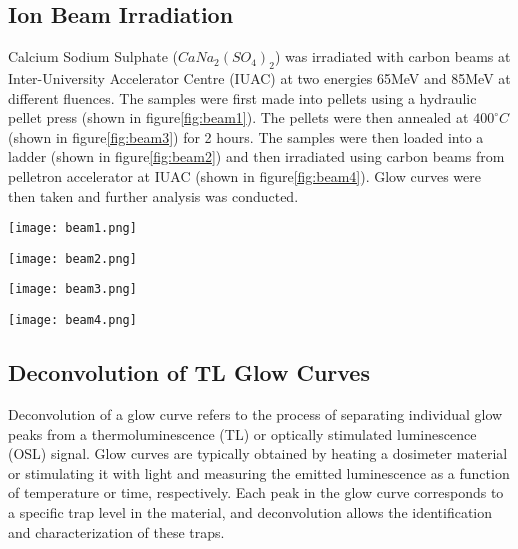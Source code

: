 \documentclass[../../Report.tex]{subfiles}
\begin{document}
    \subsection{\large Ion Beam Irradiation}
    Calcium Sodium Sulphate ($CaNa_2{(SO_4)}_2$) was irradiated with carbon beams at Inter-University Accelerator
    Centre (IUAC) at two energies 65MeV and 85MeV at different fluences. The samples were first made into pellets using
    a hydraulic pellet press (shown in figure\ref{fig:beam1}). The pellets were then annealed at $400^{\circ}C$ (shown in figure\ref{fig:beam3}) 
    for 2 hours. The samples were then loaded into a ladder (shown in figure\ref{fig:beam2}) and then irradiated using carbon beams from
    pelletron accelerator at IUAC (shown in figure\ref{fig:beam4}). Glow curves were then taken and further analysis was conducted.
    \FloatBarrier\begin{multicols}{2}
        \begin{Figure}
            \centering
            \texttt{[image: beam1.png]}
            \label{fig:beam1}
        \end{Figure}
        \begin{Figure}
            \centering
            \texttt{[image: beam2.png]}
            \label{fig:beam2}
        \end{Figure}
    \end{multicols} 
    \pagebreak
    \FloatBarrier\begin{multicols}{2}
        \begin{Figure}
            \centering
            \texttt{[image: beam3.png]}
            \label{fig:beam3}
        \end{Figure}
        \begin{Figure}
            \centering
            \texttt{[image: beam4.png]}
            \label{fig:beam4}
        \end{Figure}
    \end{multicols}

    \subsection{\large Deconvolution of TL Glow Curves}
        Deconvolution of a glow curve refers to the process of separating individual glow peaks from a 
        thermoluminescence (TL)\cite{a15} or optically stimulated luminescence (OSL) signal. Glow curves are typically 
        obtained by heating a dosimeter material or stimulating it with light and measuring the emitted 
        luminescence as a function of temperature or time, respectively. Each peak in the glow curve corresponds 
        to a specific trap level in the material, and deconvolution allows the identification and characterization
        of these traps.
\end{document}
